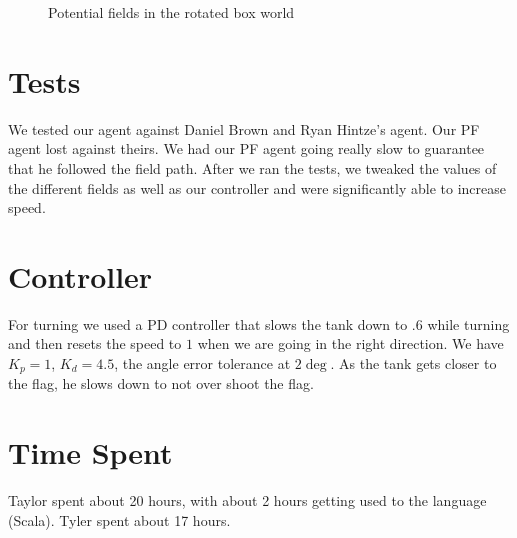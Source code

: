 \documentclass[11pt]{article}
\begin{document}
\begin{figure}[h]
	\caption{Potential fields in the rotated box world}
\end{figure}

\section{Tests}
We tested our agent against Daniel Brown and Ryan Hintze's agent.
Our PF agent lost against theirs.
We had our PF agent going really slow to guarantee that he followed the field path.
After we ran the tests, we tweaked the values of the different fields as well as our controller and were significantly able to increase speed.

\section{Controller}
For turning we used a PD controller that slows the tank down to $.6$ while turning and then resets the speed to $1$ when we are going in the right direction.
We have $K_p = 1$, $K_d = 4.5$, the angle error tolerance at $2 \deg$.
As the tank gets closer to the flag, he slows down to not over shoot the flag.

\section{Time Spent}
Taylor spent about 20 hours, with about 2 hours getting used to the language (Scala).
Tyler spent about 17 hours.
\end{document}
